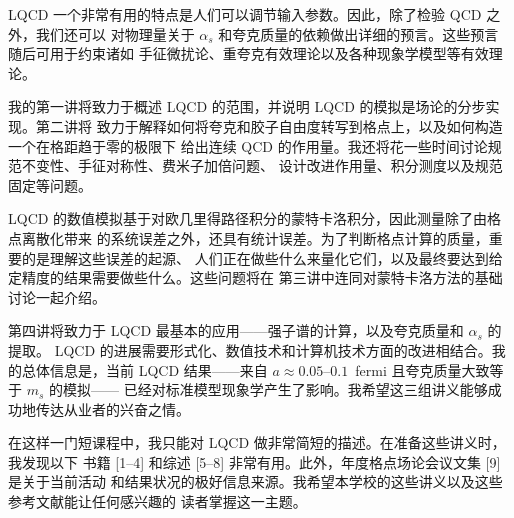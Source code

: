 LQCD 一个非常有用的特点是人们可以调节输入参数。因此，除了检验 QCD 之外，我们还可以
对物理量关于 $\alpha_s$ 和夸克质量的依赖做出详细的预言。这些预言随后可用于约束诸如
手征微扰论、重夸克有效理论以及各种现象学模型等有效理论。

我的第一讲将致力于概述 LQCD 的范围，并说明 LQCD 的模拟是场论的分步实现。第二讲将
致力于解释如何将夸克和胶子自由度转写到格点上，以及如何构造一个在格距趋于零的极限下
给出连续 QCD 的作用量。我还将花一些时间讨论规范不变性、手征对称性、费米子加倍问题、
设计改进作用量、积分测度以及规范固定等问题。

LQCD 的数值模拟基于对欧几里得路径积分的蒙特卡洛积分，因此测量除了由格点离散化带来
的系统误差之外，还具有统计误差。为了判断格点计算的质量，重要的是理解这些误差的起源、
人们正在做些什么来量化它们，以及最终要达到给定精度的结果需要做些什么。这些问题将在
第三讲中连同对蒙特卡洛方法的基础讨论一起介绍。

第四讲将致力于 LQCD 最基本的应用——强子谱的计算，以及夸克质量和 $\alpha_s$ 的提取。
LQCD 的进展需要形式化、数值技术和计算机技术方面的改进相结合。我的总体信息是，当前
LQCD 结果——来自 $a \approx 0.05$--$0.1$~fermi 且夸克质量大致等于 $m_s$ 的模拟——
已经对标准模型现象学产生了影响。我希望这三组讲义能够成功地传达从业者的兴奋之情。

在这样一门短课程中，我只能对 LQCD 做非常简短的描述。在准备这些讲义时，我发现以下
书籍 [1--4] 和综述 [5--8] 非常有用。此外，年度格点场论会议文集 [9] 是关于当前活动
和结果状况的极好信息来源。我希望本学校的这些讲义以及这些参考文献能让任何感兴趣的
读者掌握这一主题。
